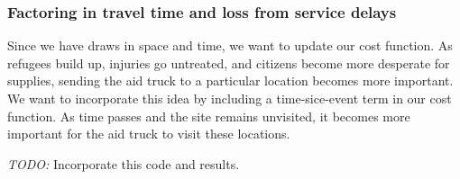 \documentclass{article} %
\begin{document}
\subsubsection{Factoring in travel time and loss from service delays}

Since we have draws in space and time, we want to update our cost function. As refugees build up, injuries go untreated, and citizens become more desperate for supplies, sending the aid truck to a particular location becomes more important. We want to incorporate this idea by including a time-sice-event term in our cost function. As time passes and the site remains unvisited, it becomes more important for the aid truck to visit these locations. 

\emph{TODO:} Incorporate this code and results.


\end{document}

